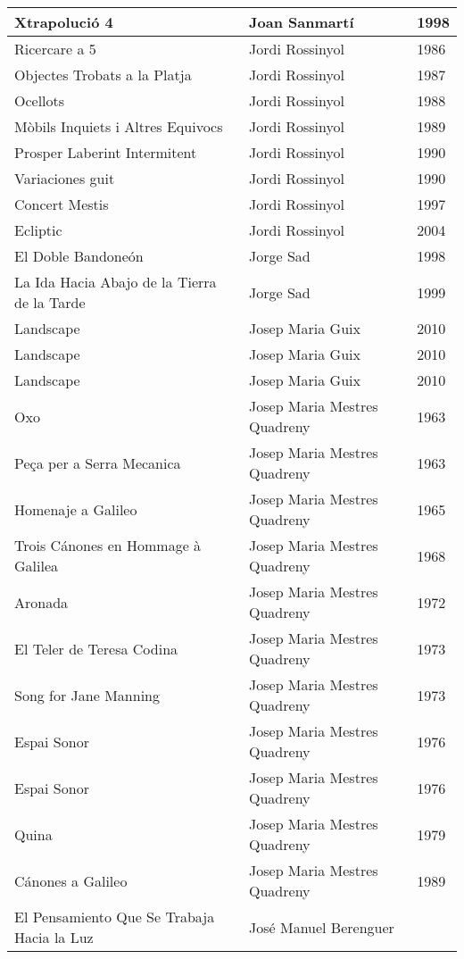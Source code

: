\begin{center}
\begin{longtable}{ p{}  p{}  p{} }
Xtrapolució 4 & Joan Sanmartí & 1998 \\ \midrule 
Ricercare a 5 & Jordi Rossinyol & 1986 \\ \midrule 
Objectes Trobats a la Platja & Jordi Rossinyol & 1987 \\ \midrule 
Ocellots & Jordi Rossinyol & 1988 \\ \midrule 
Mòbils Inquiets i Altres Equivocs & Jordi Rossinyol & 1989 \\ \midrule 
Prosper Laberint Intermitent & Jordi Rossinyol & 1990 \\ \midrule 
Variaciones guit & Jordi Rossinyol & 1990 \\ \midrule 
Concert Mestis & Jordi Rossinyol & 1997 \\ \midrule 
Ecliptic & Jordi Rossinyol & 2004 \\ \midrule 
El Doble Bandoneón & Jorge Sad & 1998 \\ \midrule 
La Ida Hacia Abajo de la Tierra de la Tarde & Jorge Sad & 1999 \\ \midrule 
Landscape & Josep Maria Guix & 2010 \\ \midrule 
Landscape & Josep Maria Guix & 2010 \\ \midrule 
Landscape & Josep Maria Guix & 2010 \\ \midrule 
Oxo & Josep Maria Mestres Quadreny & 1963 \\ \midrule 
Peça per a Serra Mecanica & Josep Maria Mestres Quadreny & 1963 \\ \midrule 
Homenaje a Galileo & Josep Maria Mestres Quadreny & 1965 \\ \midrule 
Trois Cánones en Hommage à Galilea & Josep Maria Mestres Quadreny & 1968 \\ \midrule 
Aronada & Josep Maria Mestres Quadreny & 1972 \\ \midrule 
El Teler de Teresa Codina & Josep Maria Mestres Quadreny & 1973 \\ \midrule 
Song for Jane Manning & Josep Maria Mestres Quadreny & 1973 \\ \midrule 
Espai Sonor & Josep Maria Mestres Quadreny & 1976 \\ \midrule 
Espai Sonor & Josep Maria Mestres Quadreny & 1976 \\ \midrule 
Quina & Josep Maria Mestres Quadreny & 1979 \\ \midrule 
Cánones a Galileo & Josep Maria Mestres Quadreny & 1989 \\ \midrule 
El Pensamiento Que Se Trabaja Hacia la Luz & José Manuel Berenguer &  \\ \midrule 

\end{longtable}
\end{center}
